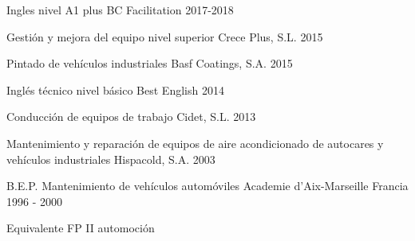 

\begin{cventries}

  \cventry
    {Ingles nivel A1 plus} %
    {BC Facilitation} %
    {} %
    {2017-2018} %
    {}

  \cventry
    {Gestión y mejora del equipo nivel superior} %
    {Crece Plus, S.L.} %
    {} %
    {2015} %
    {}

  \cventry
    {Pintado de vehículos industriales} %
    {Basf Coatings, S.A.} %
    {} %
    {2015} %
    {}

  \cventry
    {Inglés técnico nivel básico} %
    {Best English} %
    {} %
    {2014} %
    {}

  \cventry
    {Conducción de equipos de trabajo} %
    {Cidet, S.L.} %
    {} %
    {2013} %
    {}

  \cventry
    {Mantenimiento y reparación de equipos de aire acondicionado de autocares y vehículos industriales} %
    {Hispacold, S.A.} %
    {} %
    {2003} %
    {}

  \cventry
    {B.E.P. Mantenimiento de vehículos automóviles} %
    {Academie d’Aix-Marseille} %
    {Francia} %
    {1996 - 2000} %
    {
      \begin{cvitems} %
        \item {Equivalente FP II automoción}
      \end{cvitems}
    }

\end{cventries}
